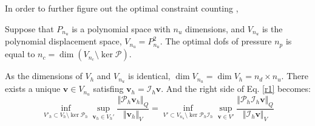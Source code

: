 In order to further figure out the optimal constraint counting ,
\begin{thm}
    Suppose that $P_{n_u}$ is a polynomial space with $n_u$ dimensions, and $V_{n_u}$ is the polynomial displacement space, $V_{n_u} = P_{n_u}^2$. The optimal dofs of pressure $n_p$ is equal to $n_c = \dim(V_{n_c}\setminus \ker \mathcal P)$.
\end{thm}
\begin{pf}
    As the dimensions of $V_h$ and $V_{n_u}$ is identical, $\dim V_{n_u}=\dim V_h = n_d\times n_u$. There exists a unique $\boldsymbol v \in V_{n_u}$ satisfing $\boldsymbol v_h = \mathcal I_h \boldsymbol v$. And the right side of Eq. \eqref{r1} becomes:
\begin{equation}\label{r21}
\inf_{V'_h \subset V_h\setminus \ker \mathcal P_h}\sup_{\boldsymbol v_h \in V_h'} \frac{\Vert \mathcal P_h \boldsymbol v_h \Vert_Q}{\Vert \boldsymbol v_h \Vert_V} = 
\inf_{V'\subset V_{n_u}\setminus \ker \mathcal P_h \mathcal I_h}\sup_{\boldsymbol v \in V'} \frac{\Vert \mathcal P_h \mathcal I_h \boldsymbol v \Vert_Q}{\Vert \mathcal I_h \boldsymbol v \Vert_V}
\end{equation}


\end{pf}
